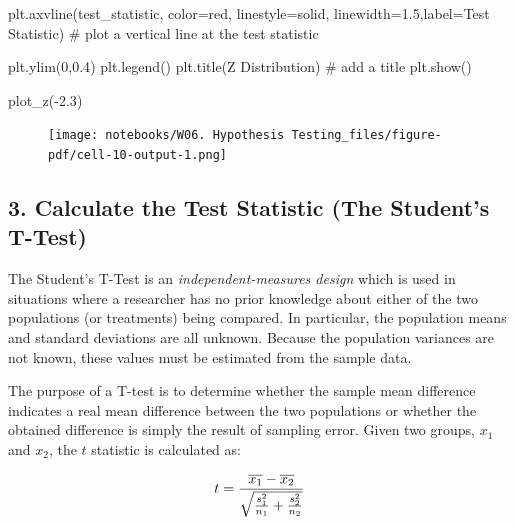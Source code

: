 \documentclass[
  letterpaper,
  DIV=11,
  numbers=noendperiod]{scrreprt}
\newenvironment{Shaded}{\begin{snugshade}}{\end{snugshade}}
\newcommand{\CommentTok}[1]{\textcolor[rgb]{0.37,0.37,0.37}{#1}}
\newcommand{\DecValTok}[1]{\textcolor[rgb]{0.68,0.00,0.00}{#1}}
\newcommand{\FloatTok}[1]{\textcolor[rgb]{0.68,0.00,0.00}{#1}}
\newcommand{\NormalTok}[1]{\textcolor[rgb]{0.00,0.23,0.31}{#1}}
\newcommand{\OperatorTok}[1]{\textcolor[rgb]{0.37,0.37,0.37}{#1}}
\newcommand{\StringTok}[1]{\textcolor[rgb]{0.13,0.47,0.30}{#1}}
\begin{document}
\begin{Shaded}
\begin{Highlighting}[]
\NormalTok{    plt.axvline(test\_statistic, color}\OperatorTok{=}\StringTok{\textquotesingle{}red\textquotesingle{}}\NormalTok{, linestyle}\OperatorTok{=}\StringTok{\textquotesingle{}solid\textquotesingle{}}\NormalTok{, linewidth}\OperatorTok{=}\FloatTok{1.5}\NormalTok{,label}\OperatorTok{=}\StringTok{\textquotesingle{}Test Statistic\textquotesingle{}}\NormalTok{) }\CommentTok{\# plot a vertical line at the test statistic}


\NormalTok{    plt.ylim(}\DecValTok{0}\NormalTok{,}\FloatTok{0.4}\NormalTok{)}
\NormalTok{    plt.legend()}
\NormalTok{    plt.title(}\StringTok{\textquotesingle{}Z Distribution\textquotesingle{}}\NormalTok{) }\CommentTok{\# add a title}
\NormalTok{    plt.show()}

\NormalTok{plot\_z(}\OperatorTok{{-}}\FloatTok{2.3}\NormalTok{)}
\end{Highlighting}
\end{Shaded}

\begin{figure}[H]

{\centering \texttt{[image: notebooks/W06. Hypothesis Testing\_files/figure-pdf/cell-10-output-1.png]}

}

\end{figure}

\hypertarget{calculate-the-test-statistic-the-students-t-test}{%
\subsection{3. Calculate the Test Statistic (The Student's
T-Test)}\label{calculate-the-test-statistic-the-students-t-test}}

The Student's T-Test is an \emph{independent-measures design} which is
used in situations where a researcher has no prior knowledge about
either of the two populations (or treatments) being compared. In
particular, the population means and standard deviations are all
unknown. Because the population variances are not known, these values
must be estimated from the sample data.

The purpose of a T-test is to determine whether the sample mean
difference indicates a real mean difference between the two populations
or whether the obtained difference is simply the result of sampling
error. Given two groups, \(x_1\) and \(x_2\), the \(t\) statistic is
calculated as:

\[ \Huge t = {\frac{\overline{x_1}-\overline{x_2}} {\sqrt{\frac{s^2_1}{n_1} + \frac{s^2_2}{n_2}}}} \]
\end{document}
